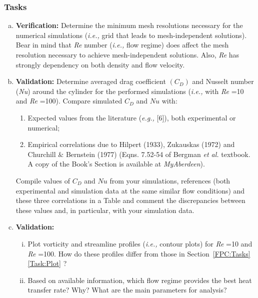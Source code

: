 \documentclass[12pts,a4paper,amsmath,amssymb,floatfix]{article}%
\newcommand{\eg}{{\it e.g., }}
\newcommand{\ie}{{\it i.e., }}
\newcommand\Rey{\mbox{\textit{Re}}\,\,}
\begin{document}
     
     \begin{shaded}
        \subsubsection{Tasks}\label{FPHC:Tasks}
        \begin{enumerate}[a)]
           \item {\bf Verification:} Determine the minimum mesh resolutions necessary for the numerical simulations (\ie grid that leads to mesh-independent solutions). Bear in mind that \Rey number (\ie flow regime) does affect the mesh resolution necessary to achieve mesh-independent solutions. Also, \Rey has strongly dependency on both density and flow velocity.
           \item {\bf Validation:} Determine averaged drag coefficient $\left(C_{D}\right)$ and Nusselt number ({\it Nu}) around the cylinder for the performed simulations (\ie with \Rey=10 and \Rey=100). Compare simulated $C_{D}$ and $Nu$ with:
             \begin{enumerate}
               \item Expected values from the literature (\eg [6]), both experimental or numerical;
               \item Empirical correlations due to Hilpert (1933), Zukauskas (1972) and Churchill $\&$ Bernstein (1977) (Eqns. 7.52-54 of Bergman {\it et al.} textbook. A copy of the Book's Section is available at {\it MyAberdeen}).
             \end{enumerate}
             Compile values of $C_{D}$ and $Nu$ from your simulations, references (both experimental and simulation data at the same similar flow conditions) and these three correlations in a Table and comment the discrepancies between these values and, in particular, with your simulation data.
           \item {\bf Validation:}
             \begin{enumerate}[i)]
               \item Plot vorticity and streamline profiles (\ie contour plots) for \Rey=10 and \Rey=100. How do these profiles differ from those in Section~\ref{FPC:Tasks} \ref{Task:Plot} ?
               \item Based on available information, which flow regime provides the best heat transfer rate? Why? What are the main parameters for analysis?
             \end{enumerate}
        \end{enumerate}
     \end{shaded}
\end{document}
